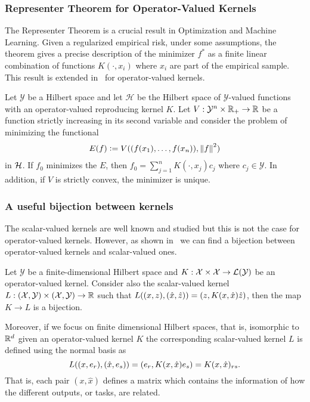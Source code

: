 \subsubsection*{Representer Theorem for Operator-Valued Kernels}
The Representer Theorem is a crucial result in Optimization and Machine Learning. Given a regularized empirical risk, under some assumptions, the theorem gives a precise description of the minimizer $f^*$ as a finite linear combination of functions $K(\cdot, x_i)$ where $x_i$ are part of the empirical sample.
This result is extended in~\cite[Theorem 4.2]{MicchelliP05} for operator-valued kernels.
\begin{theorem}
    Let $\mathcal{Y}$ be a Hilbert space and let $\mathcal{H}$ be the Hilbert space of $\mathcal{Y}$-valued functions with an operator-valued reproducing kernel $K$. Let $V: \mathcal{Y}^n \times \mathbb{R}_+ \to \mathbb{R}$ be a function strictly increasing in its second variable and consider the problem of minimizing the functional    
    \begin{equation}\label{eq:representer_functional}
        \begin{aligned}
            E(f) \defeq V((f(x_1), \ldots, f(x_n)), \norm{f}^2)
        \end{aligned}
    \end{equation}
    in $\mathcal{H}$.
    If
    $f_0$ minimizes the $E$, then $f_0 = \sum_{j=1}^n K(\cdot, x_j) c_j$ where $c_j \in \mathcal{Y}$. In addition, if $V$ is strictly convex, the minimizer is unique. 
\end{theorem}

\subsubsection*{A useful bijection between kernels}
The scalar-valued kernels are well known and studied but this is not the case for operator-valued kernels. However, as shown in~\cite{Hein04kernels,BaldassarreRBV12} we can find a bijection between operator-valued kernels and scalar-valued ones.
\begin{lemma}\label{lemma:kernel_bijection}
    Let $\mathcal{Y}$ be a finite-dimensional Hilbert space and
    $K: \mathcal{X} \times \mathcal{X} \to \mathcal{L}(\mathcal{Y})$
    be an operator-valued kernel. Consider also the scalar-valued kernel
    $L: (\mathcal{X}, \mathcal{Y}) \times (\mathcal{X}, \mathcal{Y}) \to \mathbb{R}$
    such that $L((x, z), (\hat{x}, \hat{z})) = \left( z, K(x, \hat{x}) \hat{z} \right)$, then the map $K \to L$ is a bijection.
\end{lemma}
Moreover, if we focus on finite dimensional Hilbert spaces, that is, isomorphic to $\mathbb{R}^d$ given an operator-valued kernel $K$ the corresponding scalar-valued kernel $L$ is defined using the normal basis as
$$ L((x, e_r), (\hat{x}, e_s)) = \left( e_r, K(x, \hat{x}) e_s \right) = K(x, \hat{x})_{rs} .$$
That is, each pair $(x, \hat{x})$ defines a matrix which contains the information of how the different outputs, or tasks, are related.
 
